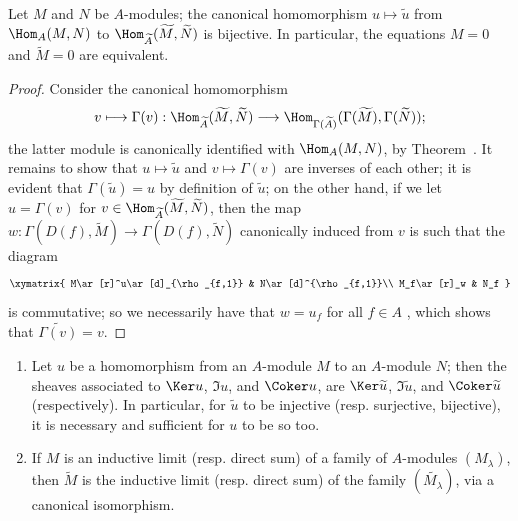 \begin{corollary}[1.3.8]
\label{I.1.3.8}
Let $M$ and $N$ be $A$-modules;
the canonical homomorphism $u\mapsto\widetilde{u}$ from $\Hom_A(M,N)$ to $\Hom_{\widetilde{A}}(\widetilde{M},\widetilde{N})$ is bijective.
In particular, the equations $M=0$ and $\widetilde{M}=0$ are equivalent.
\end{corollary}

\begin{proof}
Consider the canonical homomorphism
\[
  v\longmapsto\Gamma(v):
  \Hom_{\widetilde{A}}(\widetilde{M},\widetilde{N})
  \longrightarrow
  \Hom_{\Gamma(\widetilde{A})}(\Gamma(\widetilde{M}),\Gamma(\widetilde{N}));
\]
the latter module is canonically identified with $\Hom_A(M,N)$, by Theorem~.
It remains to show that $u\mapsto\widetilde{u}$ and $v\mapsto\Gamma(v)$ are inverses of each other;
it is evident that $\Gamma(\widetilde{u})=u$ by definition of $\widetilde{u}$;
on the other hand, if we let $u=\Gamma(v)$ for $v\in\Hom_{\widetilde{A}}(\widetilde{M},\widetilde{N})$, then the map $w:\Gamma(D(f),\widetilde{M})\to\Gamma(D(f),\widetilde{N})$ canonically induced from $v$ is such that the diagram
\[
  \xymatrix{
    M\ar[r]^u\ar[d]_{\rho_{f,1}} & N\ar[d]^{\rho_{f,1}}\\
    M_f\ar[r]_w & N_f
  }
\]
is commutative;
so we necessarily have that $w=u_f$ for all $f\in A$ , which shows that $\widetilde{\Gamma(v)}=v$.
\end{proof}

\begin{corollary}[1.3.9]
\label{I.1.3.9}
\medskip\noindent
\begin{enumerate}
  \item[{\rm(i)}] Let $u$ be a homomorphism from an $A$-module $M$ to an $A$-module $N$;
    then the sheaves associated to $\Ker u$, $\Im u$, and $\Coker u$, are $\Ker\widetilde{u}$, $\Im\widetilde{u}$, and $\Coker\widetilde{u}$ (respectively).
    In particular, for $\widetilde{u}$ to be injective (resp. surjective, bijective), it is necessary and sufficient for $u$ to be so too.
  \item[{\rm(ii)}] If $M$ is an inductive limit (resp. direct sum) of a family of $A$-modules $(M_\lambda)$, then $\widetilde{M}$ is the inductive limit (resp. direct sum) of the family $(\widetilde{M_\lambda})$, via a canonical isomorphism.
\end{enumerate}
\end{corollary}

